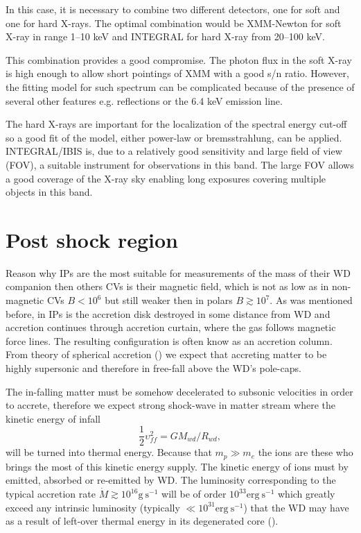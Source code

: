 \documentclass[oneside,a4paper,11pt]{report}
\begin{document}
In this case, it is necessary to combine two different detectors, one for soft and one 
for hard X-rays. The optimal combination would be XMM-Newton for soft X-ray in range 1–10 keV 
and INTEGRAL for hard X-ray from 20–100 keV. 

This combination provides a good compromise. The photon flux in the soft X-ray is high enough 
to allow short pointings of XMM with a good s/n ratio. However, the fitting model for such spectrum 
can be complicated because of the presence of several other features e.g. reflections or the 6.4 keV 
emission line.

The hard X-rays are important for the localization of the spectral energy cut-off so a good fit 
of the model, either power-law or bremsstrahlung, can be applied. INTEGRAL/IBIS is, 
due to a relatively good sensitivity and large field of view (FOV), a suitable instrument 
for observations in this band. The large FOV allows a good coverage 
of the X-ray sky enabling long exposures covering multiple objects in this band.  

\section{Post shock region}
Reason why IPs are the most suitable for measurements of the mass of their WD companion then others CVs 
is their magnetic field, which is not as low as in non-magnetic CVs $B<10^6$ but still weaker then in 
polars $B\gtrsim10^7$. 
As was mentioned before, in IPs is the accretion disk destroyed in some distance from WD and accretion 
continues through accretion curtain, where the gas follows magnetic force lines. 
The resulting configuration is often know as an accretion column. 
From theory of spherical accretion (\citet{accpower:1}) we expect that accreting matter to be highly 
supersonic and therefore in free-fall above the WD's pole-caps. 

The in-falling matter must be somehow decelerated to subsonic velocities in order to accrete, 
therefore we expect strong shock-wave in matter stream where the kinetic energy of infall 
\begin{equation}
\frac{1}{2}\upsilon_{ff}^2 = GM_{wd}/R_{wd}, 
\end{equation}
will be turned into thermal energy. Because that $m_p \gg m_e$ the ions are these who brings the most of this kinetic energy supply. 
The kinetic energy of ions must by emitted, absorbed or re-emitted by WD. The luminosity corresponding 
to the typical accretion rate $\dot{M} \gtrsim 10^{16} \mathrm{g\:s^{-1}}$ will be of order 
$10^{33} \mathrm{erg\:s^{-1}}$ which greatly exceed any intrinsic luminosity (typically 
$\ll 10^{31} \mathrm{erg\:s^{-1}}$) that the WD may have as a result of left-over thermal energy in its 
degenerated core (\citet{accpower:1}).  
\end{document}
